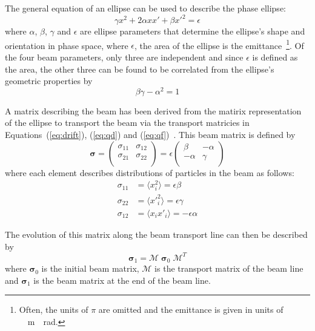 
The general equation of an ellipse can be used to describe the phase ellipse:
\begin{equation}
	\gamma x^2 + 2\alpha xx' + \beta x'^2 = \epsilon
\end{equation}
where \(\alpha\),  \(\beta\), \(\gamma\) and \(\epsilon\) are ellipse parameters
that determine the ellipse's shape and orientation in phase space, where
\(\epsilon\), the area of the ellipse is the emittance~\footnote{Often, the
units of \(\pi\) are omitted and the emittance is given in units of
\si{\pi\;\meter\;\radian}.}. Of the four beam parameters, only three are
independent and since \(\epsilon\) is defined as the area, the other three can
be found to be correlated from the ellipse's geometric properties by
\begin{equation}
	\beta\gamma - \alpha^2 = 1
\end{equation}

A matrix describing the beam has been derived from the matirix representation of
the ellipse to transport the beam via the transport matricies in
Equations~(\ref{eq:drift}), (\ref{eq:qd}) and
(\ref{eq:qf})~\cite{wiedemann2007particle}. This beam matrix is defined by
\begin{equation}
	\bm{\sigma} =
	\begin{pmatrix}
		\sigma_{11} & \sigma_{12} \\
		\sigma_{21} & \sigma_{22} \\
	\end{pmatrix}
	=
	\epsilon
	\begin{pmatrix}
		\beta & -\alpha \\
		-\alpha & \gamma \\
	\end{pmatrix}
\end{equation}
where each element describes distributions of particles in the beam as follows:
\begin{align}
	\sigma_{11} &= \langle x_i^2 \rangle = \epsilon\beta \\
	\sigma_{22} &= \langle {x'}_i^2 \rangle = \epsilon\gamma \\
	\sigma_{12} &= \langle x_i x'_i \rangle = -\epsilon\alpha
\end{align}

The evolution of this matrix along the beam transport line can then be described
by
\begin{equation}
	\bm{\sigma}_1 = \mathcal{M}\;\bm{\sigma}_0\;\mathcal{M}^T
	\label{eq:apply}
\end{equation}
where \(\bm{\sigma}_0\) is the initial beam matrix, \(\mathcal{M}\) is the
transport matrix of the beam line and \(\bm{\sigma}_1\) is the beam matrix at
the end of the beam line.

